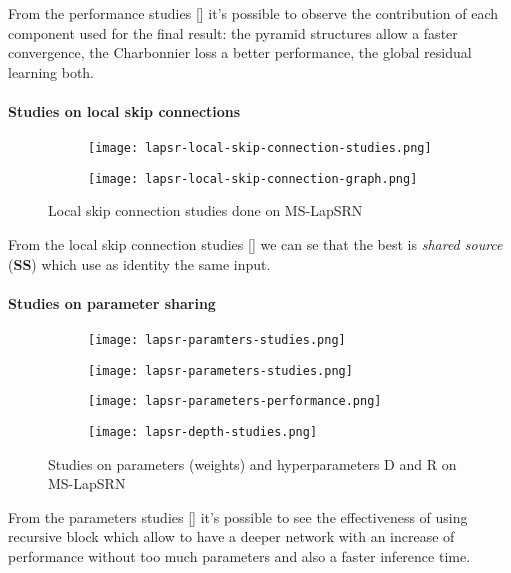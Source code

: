 From the performance studies [] it's possible to observe the contribution of each component used for the final result: the pyramid structures allow a faster convergence, the Charbonnier loss a better performance, the global residual learning both.

\paragraph{Studies on local skip connections}
\begin{figure}
    \begin{subfigure}{0.49\textwidth}
        \centering
        \texttt{[image: lapsr-local-skip-connection-studies.png]}
    \end{subfigure}
    \begin{subfigure}{0.49\textwidth}
        \centering
        \texttt{[image: lapsr-local-skip-connection-graph.png]}
    \end{subfigure}
    \caption{Local skip connection studies done on MS-LapSRN}\label{lapsr:lsc-studies}
\end{figure}
From the local skip connection studies [] we can se that the best is \textit{shared source} (\textbf{SS}) which use as identity the same input.

\paragraph{Studies on parameter sharing}
\begin{figure}
    \begin{subfigure}{0.49\textwidth}
        \centering
        \texttt{[image: lapsr-paramters-studies.png]}
    \end{subfigure}
    \begin{subfigure}{0.49\textwidth}
        \centering
        \texttt{[image: lapsr-parameters-studies.png]}
    \end{subfigure}
    \begin{subfigure}{0.49\textwidth}
        \centering
        \texttt{[image: lapsr-parameters-performance.png]}
    \end{subfigure}
    \begin{subfigure}{0.49\textwidth}
        \centering
        \texttt{[image: lapsr-depth-studies.png]}
    \end{subfigure}
    \caption{Studies on parameters (weights) and hyperparameters D and R on MS-LapSRN}\label{lapsr:parameters-studies}
\end{figure}
From the parameters studies [] it's possible to see the effectiveness of using recursive block which allow to have a deeper network with an increase of performance without too much parameters and also a faster inference time.

